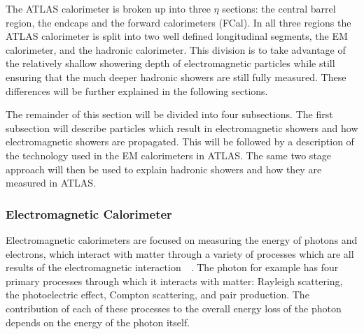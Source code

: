 The ATLAS calorimeter is broken up into three $\eta$ sections: the central barrel region, the endcaps and the forward calorimeters (FCal).  
In all three regions the ATLAS calorimeter is split into two well defined longitudinal segments, the \gls{EM} calorimeter, and the hadronic calorimeter.   
This division is to take advantage of the relatively shallow showering depth of electromagnetic particles while still ensuring that the much deeper hadronic showers are still fully measured.  
These differences will be further explained in the following sections.  

The remainder of this section will be divided into four subsections.  
The first subsection will describe particles which result in electromagnetic showers and how electromagnetic showers are propagated.  
This will be followed by a description of the technology used in the EM calorimeters in ATLAS.  
The same two stage approach will then be used to explain hadronic showers and how they are measured in ATLAS.  

\subsubsection{Electromagnetic Calorimeter}
\label{EMCalo} 

Electromagnetic calorimeters are focused on measuring the energy of photons and electrons, which interact with matter through a variety of processes which are all results of the electromagnetic interaction~\cite{grupen2008particle}~\cite{Wigmans2008}.  
The photon for example has four primary processes through which it interacts with matter: Rayleigh scattering, the photoelectric effect, Compton scattering, and pair production.  
The contribution of each of these processes to the overall energy loss of the photon depends on the energy of the photon itself.  

